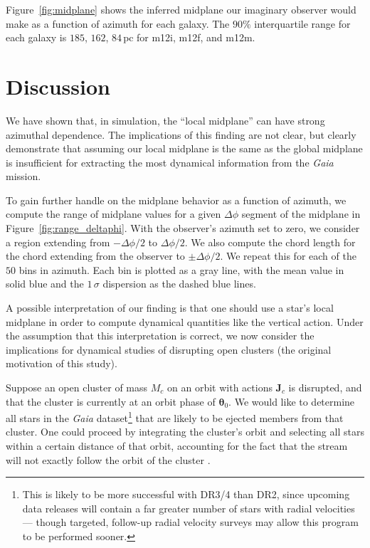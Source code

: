 \documentclass[twocolumn]{aastex62}
\newcommand{\pc}{\text{pc}}
\begin{document}
Figure~\ref{fig:midplane} shows the inferred midplane our imaginary observer
would make as a function of azimuth for each galaxy. The $90\%$ interquartile
range for each galaxy is $185$, $162$, $84\,\pc$ for m12i, m12f, and m12m. 

\begin{figure*}
\caption{Caption.}
\label{fig:midplane}
\end{figure*}

\section{Discussion} \label{sec:discussion}
We have shown that, in simulation, the ``local midplane'' can have strong
azimuthal dependence. The implications of this finding are not clear, but
clearly demonstrate that assuming our local midplane is the same as the global
midplane is insufficient for extracting the most dynamical information from
the {\em Gaia} mission.

To gain further handle on the midplane behavior as a function of azimuth, we
compute the range of midplane values for a given $\Delta \phi$ segment of the
midplane in Figure~\ref{fig:range_deltaphi}. With the observer's azimuth set
to zero, we consider a region extending from $-\Delta \phi/2$ to
$\Delta\phi/2$. We also compute the chord length for the chord extending from
the observer to $\pm \Delta\phi/2$. We repeat this for each of the $50$ bins
in azimuth. Each bin is plotted as a gray line, with the mean value in solid
blue and the $1\,\sigma$ dispersion as the dashed blue lines.

\begin{figure*}
\caption{Caption.}
\label{fig:range_deltaphi}
\end{figure*}

A possible interpretation of our finding is that one should use a star's local
midplane in order to compute dynamical quantities like the vertical action.
Under the assumption that this interpretation is correct, we now consider the
implications for dynamical studies of disrupting open clusters (the original
motivation of this study).

Suppose an open cluster of mass $M_c$ on an orbit with actions $\bm{J}_c$ is
disrupted, and that the cluster is currently at an orbit phase of
$\bm{\theta}_0$. We would like to determine all stars in the {\em Gaia}
dataset\footnote{This is likely to be more successful with DR3/4 than DR2,
since upcoming data releases will contain a far greater number of stars with
radial velocities --- though targeted, follow-up radial velocity surveys may
allow this program to be performed sooner.} that are likely to be ejected
members from that cluster. One could proceed by integrating the cluster's
orbit and selecting all stars within a certain distance of that orbit,
accounting for the fact that the stream will not exactly follow the orbit of
the cluster \citep[e.g.][]{2011MNRAS.413.1852E}.
\end{document}
